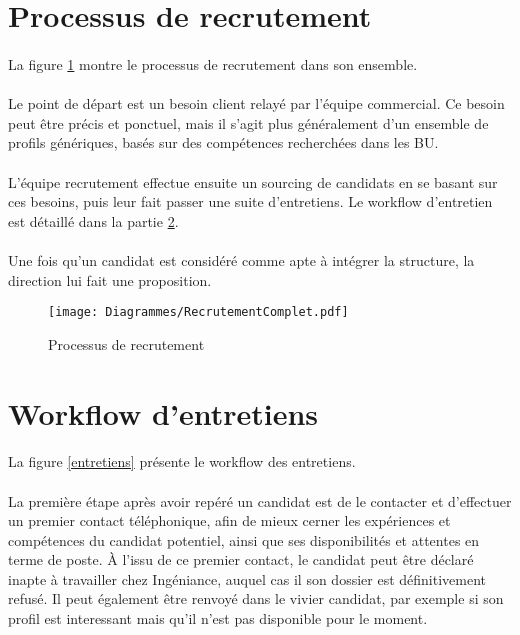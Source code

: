 \section{Processus de recrutement}

\paragraph{} La figure \ref{recrutementFull} montre le processus de recrutement dans son ensemble.
\paragraph{} Le point de départ est un besoin client relayé par l'équipe commercial. Ce besoin peut être précis et ponctuel, mais il s'agit plus généralement d'un ensemble de profils génériques, basés sur des compétences recherchées dans les BU.
\paragraph{} L'équipe recrutement effectue ensuite un sourcing de candidats en se basant sur ces besoins, puis leur fait passer une suite d'entretiens. Le workflow d'entretien est détaillé dans la partie \ref{sec:entretiens}.
\paragraph{} Une fois qu'un candidat est considéré comme apte à intégrer la structure, la direction lui fait une proposition.

\begin{figure}
	\begin{sideways}
	\centering
	\texttt{[image: Diagrammes/RecrutementComplet.pdf]}
	\end{sideways}
	\caption{Processus de recrutement}
	\label{recrutementFull}	
\end{figure}

\section{Workflow d'entretiens}
\label{sec:entretiens}

\paragraph{} La figure \ref{entretiens} présente le workflow des entretiens.
\paragraph{} La première étape après avoir repéré un candidat est de le contacter et d'effectuer un premier contact téléphonique, afin de mieux cerner les expériences et compétences du candidat potentiel, ainsi que ses disponibilités et attentes en terme de poste. À l'issu de ce premier contact, le candidat peut être déclaré inapte à travailler chez Ingéniance, auquel cas il son dossier est définitivement refusé. Il peut également être renvoyé dans le vivier candidat, par exemple si son profil est interessant mais qu'il n'est pas disponible pour le moment. 
